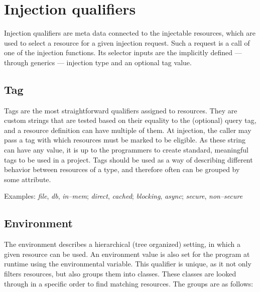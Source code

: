 	\section{Injection qualifiers}
	
		Injection qualifiers are meta data connected to the injectable resources, which are used to select a resource for a given injection request. Such a request is a call of one of the injection functions. Its selector inputs are the implicitly defined --- through generics --- injection type and an optional tag value.
	
		\subsection*{Tag}
	
		Tags are the most straightforward qualifiers assigned to resources. They are custom strings that are tested based on their equality to the (optional) query tag, and a resource definition can have multiple of them. At injection, the caller may pass a tag with which resources must be marked to be eligible. As these string can have any value, it is up to the programmers to create standard, meaningful tags to be used in a project. Tags should be used as a way of describing different behavior between resources of a type, and therefore often can be grouped by some attribute.
		
		Examples: \emph{file}, \emph{db}, \emph{in--mem};
		\emph{direct}, \emph{cached};
		\emph{blocking}, \emph{async};
		\emph{secure}, \emph{non--secure}
	
		\subsection*{Environment}

		The environment describes a hierarchical (tree organized) setting, in which a given resource can be used. An environment value is also set for the program at runtime using the  environmental variable. This qualifier is unique, as it not only filters resources, but also groups them into classes. These classes are looked through in a specific order to find matching resources. The groups are as follows:
		
